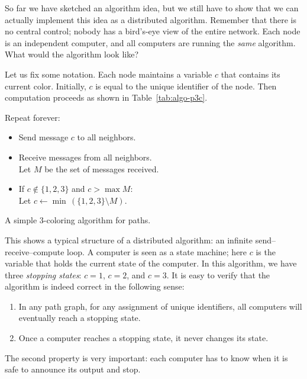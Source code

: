 So far we have sketched an algorithm idea, but we still have to show that we can actually implement this idea as a distributed algorithm. Remember that there is no central control; nobody has a bird's-eye view of the entire network. Each node is an independent computer, and all computers are running the \emph{same} algorithm. What would the algorithm look like?

Let us fix some notation. Each node maintains a variable $c$ that contains its current color. Initially, $c$ is equal to the unique identifier of the node. Then computation proceeds as shown in Table~\ref{tab:algo-p3c}.

\begin{table}
    \raggedright
    \algtoprule
    \begin{descriptionb}
        \item[Repeat forever:] \mbox{}
        \begin{itemize}
            \item Send message $c$ to all neighbors.
            \item Receive messages from all neighbors. \\
                  Let $M$ be the set of messages received.
            \item If $c \notin \{1,2,3\}$ and $c > \max M$: \\
                  Let $c \gets \min\,(\{1,2,3\} \setminus M)$.
        \end{itemize}
    \end{descriptionb}
    \algbottomrule
    \caption{A simple $3$-coloring algorithm for paths.}\label{tab:algo-p3c}
\end{table}

This shows a typical structure of a distributed algorithm: an infinite send--receive--compute loop. A computer is seen as a state machine; here $c$ is the variable that holds the current state of the computer. In this algorithm, we have three \emph{stopping states}: $c = 1$, $c = 2$, and $c = 3$. It is easy to verify that the algorithm is indeed correct in the following sense:
\begin{enumerate}
    \item In any path graph, for any assignment of unique identifiers, all computers will eventually reach a stopping state.
    \item Once a computer reaches a stopping state, it never changes its state.
\end{enumerate}
The second property is very important: each computer has to know when it is safe to announce its output and stop.

